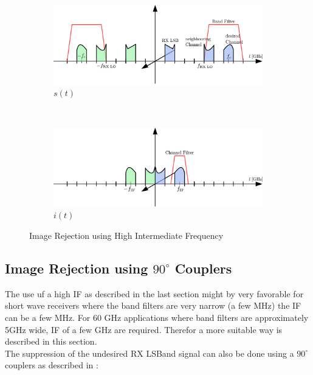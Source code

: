 \begin{figure}[h!]
  \centering
  \begin{subfigure}{0.45\textwidth}
    \centering
    \includegraphics[width=\textwidth]{figures/rx_rf_0_freq_s}
    \caption{$s(t)$}
    \label{fig:rx_rf_0_freq_s}
  \end{subfigure}
  ~
  \begin{subfigure}{0.45\textwidth}
    \centering
    \includegraphics[width=\textwidth]{figures/rx_rf_0_freq_i}
    \caption{$i(t)$}
    \label{fig:rx_rf_0_freq_i}
  \end{subfigure}
  \caption{Image Rejection using High Intermediate Frequency}
  \label{fig:rx_rf_0_freq}
\end{figure}

\subsection{Image Rejection using $90^\circ$ Couplers}
\label{sec:rx_rf_1}
The use uf a high \gls{IF} as described in the last section might
by very favorable for short wave receivers where the band filters
are very narrow (a few MHz) the \gls{IF} can be a few MHz.
For 60 GHz applications where band filters are approximately 5GHz wide,
\gls{IF} of a few GHz are required.
Therefor a more suitable way is described in this section. \\

The suppression of the undesired \gls{RX} \gls{LSBand} signal can also be done
using a $90^\circ$ couplers as described in : \\

